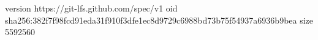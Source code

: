 version https://git-lfs.github.com/spec/v1
oid sha256:382f7f98fcd91eda31f910f3dfe1ec8d9729c6988bd73b75f54937a6936b9bea
size 5592560
